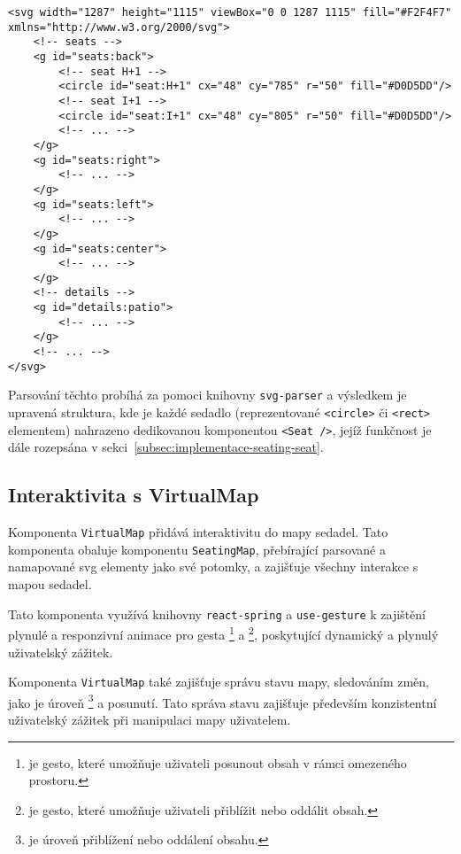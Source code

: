 \begin{verbatim}
<svg width="1287" height="1115" viewBox="0 0 1287 1115" fill="#F2F4F7" xmlns="http://www.w3.org/2000/svg">
    <!-- seats -->
    <g id="seats:back">
        <!-- seat H+1 -->
        <circle id="seat:H+1" cx="48" cy="785" r="50" fill="#D0D5DD"/>
        <!-- seat I+1 -->
        <circle id="seat:I+1" cx="48" cy="805" r="50" fill="#D0D5DD"/>
        <!-- ... -->
    </g>
    <g id="seats:right">
        <!-- ... -->
    </g>
    <g id="seats:left">
        <!-- ... -->
    </g>
    <g id="seats:center">
        <!-- ... -->
    </g>
    <!-- details -->
    <g id="details:patio">
        <!-- ... -->
    </g>
    <!-- ... -->
</svg>
\end{verbatim}

Parsování těchto probíhá za pomoci knihovny \texttt{svg-parser} a výsledkem je upravená struktura, kde je každé sedadlo (reprezentované \texttt{<circle>} či \texttt{<rect>} elementem) nahrazeno dedikovanou komponentou \texttt{<Seat />}, jejíž funkčnost je dále rozepsána v sekci~\ref{subsec:implementace-seating-seat}.

\subsection{Interaktivita s VirtualMap}
\label{subsec:implementace-seating-virtualmap}
Komponenta \texttt{VirtualMap} přidává interaktivitu do mapy sedadel.
Tato komponenta obaluje komponentu \texttt{SeatingMap}, přebírající parsované a namapované \ac{svg} elementy jako své potomky, a zajišťuje všechny interakce s mapou sedadel.

Tato komponenta využívá knihovny \texttt{react-spring} a \texttt{use-gesture} k zajištění plynulé a responzivní animace pro gesta \footnote{ je gesto, které umožňuje uživateli posunout obsah v rámci omezeného prostoru.} a \footnote{ je gesto, které umožňuje uživateli přiblížit nebo oddálit obsah.
}, poskytující dynamický a plynulý uživatelský zážitek.

Komponenta \texttt{VirtualMap} také zajišťuje správu stavu mapy, sledováním změn, jako je úroveň \footnote{ je úroveň přiblížení nebo oddálení obsahu.} a posunutí.
Tato správa stavu zajišťuje především konzistentní uživatelský zážitek při manipulaci mapy uživatelem.


